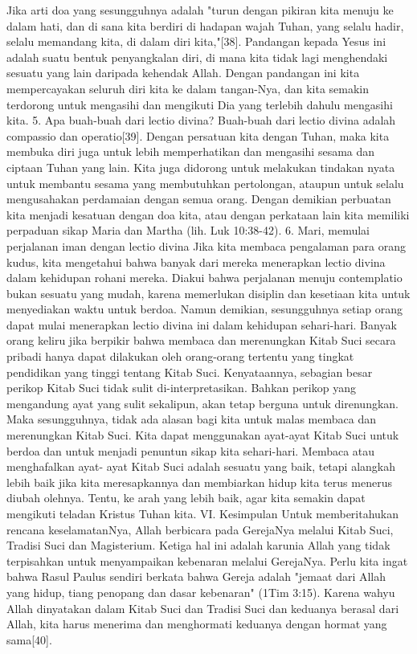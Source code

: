 Jika arti doa yang sesungguhnya adalah "turun dengan pikiran kita menuju ke dalam hati, dan di sana kita berdiri di hadapan wajah Tuhan, yang selalu hadir, selalu memandang kita, di dalam diri kita,"[38]. Pandangan kepada Yesus ini adalah suatu bentuk penyangkalan diri, di mana kita tidak lagi menghendaki sesuatu yang lain daripada kehendak Allah. Dengan pandangan ini kita mempercayakan seluruh diri kita ke dalam tangan-Nya, dan kita semakin terdorong untuk mengasihi dan mengikuti Dia yang terlebih dahulu mengasihi kita.
5. Apa buah-buah dari lectio divina?
Buah-buah dari lectio divina adalah compassio dan operatio[39]. Dengan persatuan kita dengan Tuhan, maka kita membuka diri juga untuk lebih memperhatikan dan mengasihi sesama dan ciptaan Tuhan yang lain. Kita juga didorong untuk melakukan tindakan nyata untuk membantu sesama yang membutuhkan pertolongan, ataupun untuk selalu mengusahakan perdamaian dengan semua orang. Dengan demikian perbuatan kita menjadi kesatuan dengan doa kita, atau dengan perkataan lain kita memiliki perpaduan sikap Maria dan Martha (lih. Luk 10:38-42).
6. Mari, memulai perjalanan iman dengan lectio divina
Jika kita membaca pengalaman para orang kudus, kita mengetahui bahwa banyak dari mereka menerapkan lectio divina dalam kehidupan rohani mereka. Diakui bahwa perjalanan menuju contemplatio bukan sesuatu yang mudah, karena memerlukan disiplin dan kesetiaan kita untuk menyediakan waktu untuk berdoa. Namun demikian, sesungguhnya setiap orang dapat mulai menerapkan lectio divina ini dalam kehidupan sehari-hari.
Banyak orang keliru jika berpikir bahwa membaca dan merenungkan Kitab Suci secara pribadi hanya dapat dilakukan oleh orang-orang tertentu yang tingkat pendidikan yang tinggi tentang Kitab Suci. Kenyataannya, sebagian besar perikop Kitab Suci tidak sulit di-interpretasikan. Bahkan perikop yang mengandung ayat yang sulit sekalipun, akan tetap berguna untuk direnungkan. Maka sesungguhnya, tidak ada alasan bagi kita untuk malas membaca dan merenungkan Kitab Suci. Kita dapat menggunakan ayat-ayat Kitab Suci untuk berdoa dan untuk menjadi penuntun sikap kita sehari-hari. Membaca atau menghafalkan ayat- ayat Kitab Suci adalah sesuatu yang baik, tetapi alangkah lebih baik jika kita meresapkannya dan membiarkan hidup kita terus menerus diubah olehnya. Tentu, ke arah yang lebih baik, agar kita semakin dapat mengikuti teladan Kristus Tuhan kita.
VI. Kesimpulan
Untuk memberitahukan rencana keselamatanNya, Allah berbicara pada GerejaNya melalui Kitab Suci, Tradisi Suci dan Magisterium. Ketiga hal ini adalah karunia Allah yang tidak terpisahkan untuk menyampaikan kebenaran melalui GerejaNya. Perlu kita ingat bahwa Rasul Paulus sendiri berkata bahwa Gereja adalah "jemaat dari Allah yang hidup, tiang penopang dan dasar kebenaran" (1Tim 3:15). Karena wahyu Allah dinyatakan dalam Kitab Suci dan Tradisi Suci dan keduanya berasal dari Allah, kita harus menerima dan menghormati keduanya dengan hormat yang sama[40].
